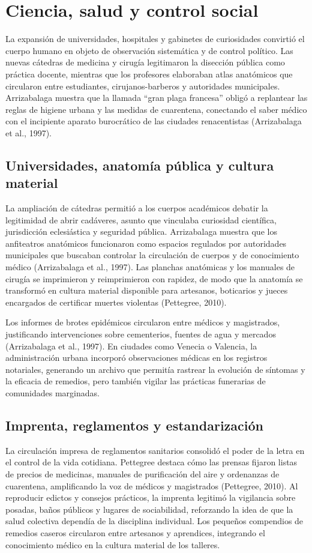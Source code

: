\chapter{Ciencia, salud y control social}
La expansión de universidades, hospitales y gabinetes de curiosidades convirtió el cuerpo humano en objeto de observación sistemática y de control político. Las nuevas cátedras de medicina y cirugía legitimaron la disección pública como práctica docente, mientras que los profesores elaboraban atlas anatómicos que circularon entre estudiantes, cirujanos-barberos y autoridades municipales. Arrizabalaga muestra que la llamada ``gran plaga francesa'' obligó a replantear las reglas de higiene urbana y las medidas de cuarentena, conectando el saber médico con el incipiente aparato burocrático de las ciudades renacentistas (Arrizabalaga et al., 1997).

\section{Universidades, anatomía pública y cultura material}
La ampliación de cátedras permitió a los cuerpos académicos debatir la legitimidad de abrir cadáveres, asunto que vinculaba curiosidad científica, jurisdicción eclesiástica y seguridad pública. Arrizabalaga muestra que los anfiteatros anatómicos funcionaron como espacios regulados por autoridades municipales que buscaban controlar la circulación de cuerpos y de conocimiento médico (Arrizabalaga et al., 1997). Las planchas anatómicas y los manuales de cirugía se imprimieron y reimprimieron con rapidez, de modo que la anatomía se transformó en cultura material disponible para artesanos, boticarios y jueces encargados de certificar muertes violentas (Pettegree, 2010).

Los informes de brotes epidémicos circularon entre médicos y magistrados, justificando intervenciones sobre cementerios, fuentes de agua y mercados (Arrizabalaga et al., 1997). En ciudades como Venecia o Valencia, la administración urbana incorporó observaciones médicas en los registros notariales, generando un archivo que permitía rastrear la evolución de síntomas y la eficacia de remedios, pero también vigilar las prácticas funerarias de comunidades marginadas.

\section{Imprenta, reglamentos y estandarización}
La circulación impresa de reglamentos sanitarios consolidó el poder de la letra en el control de la vida cotidiana. Pettegree destaca cómo las prensas fijaron listas de precios de medicinas, manuales de purificación del aire y ordenanzas de cuarentena, amplificando la voz de médicos y magistrados (Pettegree, 2010). Al reproducir edictos y consejos prácticos, la imprenta legitimó la vigilancia sobre posadas, baños públicos y lugares de sociabilidad, reforzando la idea de que la salud colectiva dependía de la disciplina individual. Los pequeños compendios de remedios caseros circularon entre artesanos y aprendices, integrando el conocimiento médico en la cultura material de los talleres.

